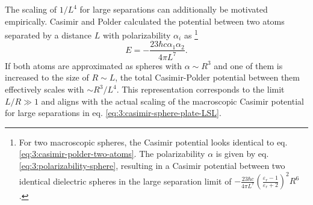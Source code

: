 The scaling of $1/L^4$ for large separations can additionally be motivated empirically. Casimir and Polder calculated the potential between two atoms separated by a distance $L$ with polarizability $\alpha_i$ as \cite{Casimir_1948a} \footnote{For two macroscopic spheres, the Casimir potential looks identical to eq. \eqref{eq:3:casimir-polder-two-atoms}. The polarizability $\alpha$ is given by eq. \eqref{eq:3:polarizability-sphere}, resulting in a Casimir potential between two identical dielectric spheres in the large separation limit of $-\frac{23 \hbar c}{4\pi L^7}\left(\frac{\varepsilon_r - 1}{\varepsilon_r + 2}\right)^2R^6$ \cite{Emig_2007}.}
\begin{equation}\label{eq:3:casimir-polder-two-atoms}
  E = -\frac{23 \hbar  c \alpha_1 \alpha_2}{4 \pi L^7} .
\end{equation}
If both atoms are approximated as spheres with $\alpha \sim R^3$ and one of them is increased to the size of $R \sim L$, the total Casimir-Polder potential between them effectively scales with $\sim R^3/L^4$.
This representation corresponds to the limit $L/R \gg 1$ and aligns with the actual scaling of the macroscopic Casimir potential for large separations in eq. \eqref{eq:3:casimir-sphere-plate-LSL}.

